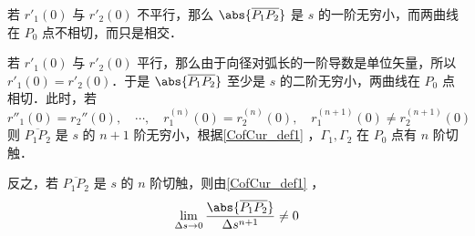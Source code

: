 若 $r'_1(0)$ 与 $r'_2(0)$ 不平行，那么 $\abs{\overline{P_1P_2}}$ 是 $s$ 的一阶无穷小，而两曲线在 $P_0$ 点不相切，而只是相交．

若 $r'_1(0)$ 与 $r'_2(0)$ 平行，那么由于向径对弧长的一阶导数是单位矢量，所以 $r'_1(0)=r'_2(0)$．于是 $\abs{\overline{P_1P_2}}$ 至少是 $s$ 的二阶无穷小，两曲线在 $P_0$ 点相切．此时，若
\begin{equation}
r''_1(0)=r_2''(0),\quad\cdots,\quad r^{(n)}_1(0)=r^{(n)}_2(0),\quad r^{(n+1)}_1(0)\neq r^{(n+1)}_2(0)
\end{equation}
则 $\overline{P_1P_2}$ 是 $s$ 的 $n+1$ 阶无穷小，根据\autoref{CofCur_def1} ，$\Gamma_1,\Gamma_2$ 在 $P_0$ 点有 $n$ 阶切触．

反之，若 $\overline{P_1P_2}$ 是 $s$ 的 $n$ 阶切触，则由\autoref{CofCur_def1} ，
\begin{equation}
\lim_{\Delta s\rightarrow0}\frac{\abs{\overline{P_1P_2}}}{\Delta s^{n+1}}\neq0
\end{equation}
